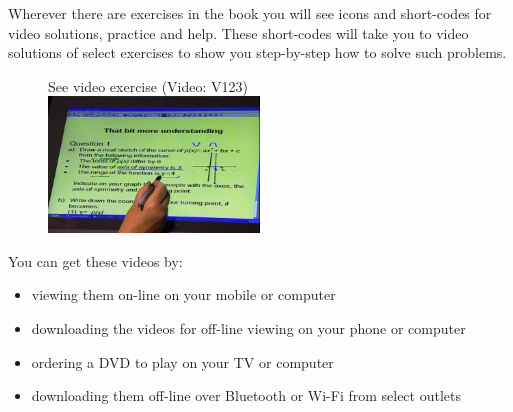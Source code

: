{\Large

Wherever there are exercises in the book you will see icons and short-codes for video solutions,
practice and help. These short-codes will take you to video solutions of select exercises to show you
step-by-step how to solve such problems. \par

\begin{figure}[h]
\begin{center}
See video exercise  (Video: V123)\\ 
\includegraphics[width=0.5\textwidth]{title_images/mindsetexercise.png}
\end{center}
\end{figure}
You can get these videos by:
\begin{itemize}
    \item viewing them on-line on your mobile or computer
    \item downloading the videos for off-line viewing on your phone or computer
    \item ordering a DVD to play on your TV or computer
    \item downloading them off-line over Bluetooth or Wi-Fi from select outlets
\end{itemize}
}


